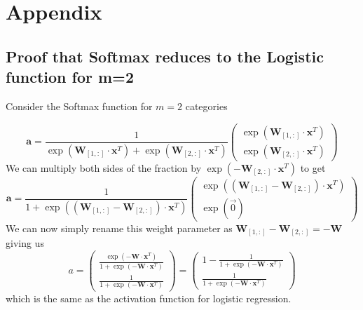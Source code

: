\documentclass[11pt,a4paper,titlepage]{article}
\begin{document}
\section{Appendix}
\subsection{Proof that Softmax reduces to the Logistic function for m=2}\label{ProofSoftmaxToLogistic}

Consider the Softmax function for $m=2$ categories

\begin{equation}
\textbf{a} = \frac{1}{ \exp(\textbf{W}_{[1,:]}\cdot \textbf{x}^T)  + \exp( \textbf{W}_{[2,:]} \cdot \textbf{x}^T ) }
\begin{pmatrix}
\exp( \textbf{W}_{[1,:]} \cdot \textbf{x}^T) \\
\exp( \textbf{W}_{[2,:]} \cdot \textbf{x}^T)
\end{pmatrix}
\end{equation}
We can multiply both sides of the fraction by $\exp(- \textbf{W}_{[2,:]} \cdot \textbf{x}^T)$ to get
\begin{equation}
\textbf{a} = \frac{1}{ 1  + \exp( (\textbf{W}_{[1,:]} -\textbf{W}_{[2,:]})\cdot \textbf{x}^T) }
\begin{pmatrix}
\exp( (\textbf{W}_{[1,:]} -\textbf{W}_{[2,:]})\cdot \textbf{x}^T) \\
\exp( \vec{0})
\end{pmatrix}
\end{equation}
We can now simply rename this weight parameter as $\textbf{W}_{[1,:]} -\textbf{W}_{[2,:]} = -\textbf{W}$ giving us
\begin{equation}
a = \begin{pmatrix}
\frac{\exp( -\textbf{W}\cdot \textbf{x}^T)}{1+\exp( -\textbf{W}\cdot \textbf{x}^T)} \\
\frac{1}{1+ \exp( -\textbf{W}\cdot \textbf{x}^T)}
\end{pmatrix} = \begin{pmatrix}
1-\frac{1}{1+\exp( -\textbf{W}\cdot \textbf{x}^T)} \\
\frac{1}{1+ \exp( -\textbf{W}\cdot \textbf{x}^T)}
\end{pmatrix} 
\end{equation}
which is the same as the activation function for logistic regression.
\end{document}
